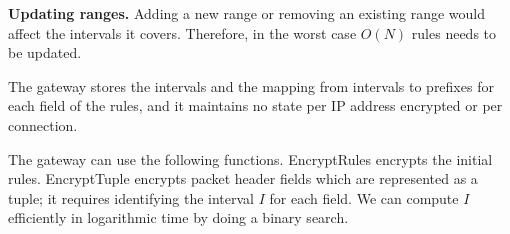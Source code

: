 %
%



\noindent \textbf{Updating ranges.}
Adding a new range or removing an existing range would affect the intervals it covers. Therefore, in the worst case $O(N)$ rules needs to be updated. 




The gateway stores the intervals and the mapping from intervals to prefixes for each field of the rules, and it maintains no state per IP address encrypted or per connection.

The gateway can use the following functions. EncryptRules encrypts the initial rules. EncryptTuple encrypts packet header fields which are represented as a tuple; it requires identifying the interval $I$ for each field. We can compute $I$ efficiently in logarithmic time by doing a binary search. 





